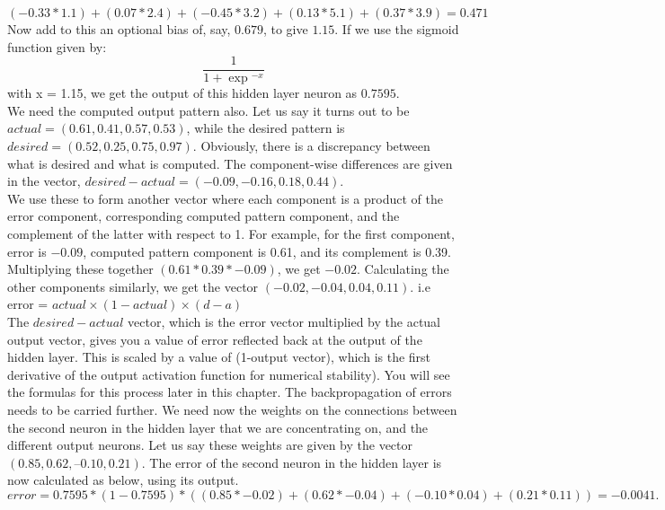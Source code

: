 $(-0.33 * 1.1) + (0.07 * 2.4) + (-0.45 * 3.2) + (0.13 * 5.1)
+ (0.37 * 3.9) = 0.471$\\

Now add to this an optional bias of, say, $0.679$, to give $1.15$. 
If we use the sigmoid function given by:
\[
 \frac{1}{1+\exp{^{-x}}}
\]
with x = 1.15, we get the output of this hidden layer neuron as $0.7595$.\\

We need the computed output pattern also. Let us say it turns out to be $actual = (0.61, 0.41, 0.57, 0.53)$, while the desired pattern is $desired = (0.52, 0.25, 0.75, 0.97)$. Obviously, there is a discrepancy between what is desired and what is computed. The component-wise differences are given in the vector, $desired - actual = (-0.09, -0.16, 0.18, 0.44)$.\\

We use these to form another vector where each component is a product of the error component, corresponding computed pattern component, and the complement of the latter with respect to 1. For example, for the first component, error is $-0.09$, computed pattern component is 0.61, and its complement is 0.39. Multiplying these together $(0.61*0.39*-0.09)$, we get $-0.02$. Calculating the other components similarly, we get the vector $(-0.02, -0.04, 0.04, 0.11)$.  i.e  error = $actual \times (1 - actual) \times (d - a)$ \\

The $desired-actual$ vector, which is the error vector multiplied by the actual output vector, gives you a value of error reflected back at the output of the hidden layer. This is scaled by a value of (1-output vector), which is the first derivative of the output activation function for numerical stability). You will see the
formulas for this process later in this chapter. The backpropagation of errors needs to be carried further. We need now the weights on the connections between the second neuron in the hidden layer that we are concentrating on, and the different output neurons. Let us say these weights are given by the vector $(0.85, 0.62, –0.10, 0.21)$. The error of the second neuron in the hidden layer is now calculated as below, using its output.\\

$error = 0.7595 * (1 - 0.7595) * ( (0.85 * -0.02) + (0.62 * -0.04)
+ ( -0.10 * 0.04) + (0.21 * 0.11)) = -0.0041.$\\

